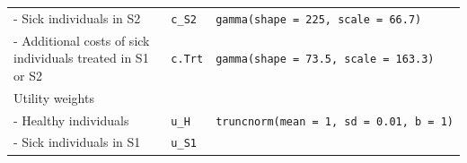 \documentclass[]{book}
\begin{document}
\begin{longtable}[]{@{}lll@{}}
\begin{minipage}[t]{0.33\columnwidth}\raggedright\strut
- Sick individuals in S2\strut
\end{minipage} & \begin{minipage}[t]{0.13\columnwidth}\raggedright\strut
\texttt{c\_S2}\strut
\end{minipage} & \begin{minipage}[t]{0.45\columnwidth}\raggedright\strut
\texttt{gamma(shape\ =\ 225,\ scale\ =\ 66.7)}\strut
\end{minipage}\tabularnewline
\begin{minipage}[t]{0.33\columnwidth}\raggedright\strut
- Additional costs of sick individuals treated in S1 or S2\strut
\end{minipage} & \begin{minipage}[t]{0.13\columnwidth}\raggedright\strut
\texttt{c.Trt}\strut
\end{minipage} & \begin{minipage}[t]{0.45\columnwidth}\raggedright\strut
\texttt{gamma(shape\ =\ 73.5,\ scale\ =\ 163.3)}\strut
\end{minipage}\tabularnewline
\begin{minipage}[t]{0.33\columnwidth}\raggedright\strut
Utility weights\strut
\end{minipage} & \begin{minipage}[t]{0.13\columnwidth}\raggedright\strut
\strut
\end{minipage} & \begin{minipage}[t]{0.45\columnwidth}\raggedright\strut
\strut
\end{minipage}\tabularnewline
\begin{minipage}[t]{0.33\columnwidth}\raggedright\strut
- Healthy individuals\strut
\end{minipage} & \begin{minipage}[t]{0.13\columnwidth}\raggedright\strut
\texttt{u\_H}\strut
\end{minipage} & \begin{minipage}[t]{0.45\columnwidth}\raggedright\strut
\texttt{truncnorm(mean\ =\ 1,\ sd\ =\ 0.01,\ b\ =\ 1)}\strut
\end{minipage}\tabularnewline
\begin{minipage}[t]{0.33\columnwidth}\raggedright\strut
- Sick individuals in S1\strut
\end{minipage} & \begin{minipage}[t]{0.13\columnwidth}\raggedright\strut
\texttt{u\_S1}\strut
\end{minipage} & \begin{minipage}[t]{0.45\columnwidth}\raggedright\strut

\end{minipage}
\end{longtable}
\end{document}
